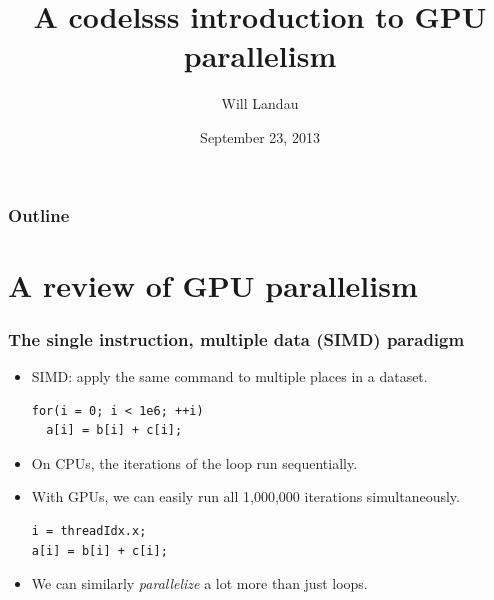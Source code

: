 \documentclass[handout]{beamer}
\title{A codelsss introduction to GPU parallelism}
\author{Will Landau}
\date{September 23, 2013}
\institute{Iowa State University}
\numberwithin{equation}{section}
\begin{document}
 
 
 \begin{frame}
\titlepage
 \end{frame}
 
 
\begin{frame}
\frametitle{Outline}
\tableofcontents
\end{frame}
 
 


\section{A review of GPU parallelism}



\begin{frame}[fragile]
\frametitle{The single instruction, multiple data (SIMD) paradigm}

\begin{itemize}
\pause \item SIMD: apply the same command to multiple places in a dataset. 

\pause \begin{lstlisting}
for(i = 0; i < 1e6; ++i)
  a[i] = b[i] + c[i];
\end{lstlisting}


\pause \item On CPUs, the iterations of the loop run sequentially.

\pause \item With GPUs, we can easily run all 1,000,000 iterations simultaneously.

\pause \begin{lstlisting}
i = threadIdx.x;
a[i] = b[i] + c[i];
\end{lstlisting}

\pause \item We can similarly \emph{parallelize} a lot more than just loops.
\end{itemize}
\end{frame}
\end{document}
